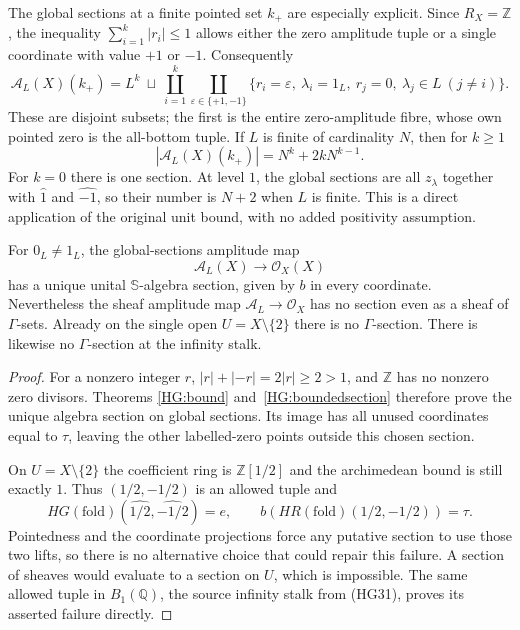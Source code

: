 The global sections at a finite pointed set $k_+$ are especially
explicit.  Since $R_X=\mathbb Z$, the inequality
$\sum_{i=1}^k|r_i|\le1$ allows either the zero amplitude
tuple or a single coordinate with value $+1$ or $-1$.
Consequently
\begin{equation}\tag{HG32}
 \mathcal A_L(X)(k_+)=
 L^k\ \sqcup\
 \coprod_{i=1}^k\coprod_{\varepsilon\in\{+1,-1\}}
       \bigl\{r_i=\varepsilon,\ \lambda_i=1_L,\
              r_j=0,\ \lambda_j\in L\ (j\ne i)\bigr\}.
\end{equation}
These are disjoint subsets; the first is the entire
zero-amplitude fibre, whose own pointed zero is the all-bottom
tuple.  If $L$ is finite of cardinality $N$, then for $k\ge1$
\begin{equation}\tag{HG33}
 |\mathcal A_L(X)(k_+)|=N^k+2kN^{k-1}.
\end{equation}
For $k=0$ there is one section.  At level $1$, the global
sections are all $z_\lambda$ together with $\widehat1$ and
$\widehat{-1}$, so their number is $N+2$ when $L$ is finite.
This is a direct application of the original unit bound, with
no added positivity assumption.

\begin{proposition}\label{HG:globalstalkdefect}
For $0_L\ne1_L$, the global-sections amplitude map
\begin{equation}\tag{HG36}
 \mathcal A_L(X)\longrightarrow\mathcal O_X(X)
\end{equation}
has a unique unital $\mathbb S$-algebra section, given by
$b$ in every coordinate.  Nevertheless the sheaf amplitude
map $\mathcal A_L\to\mathcal O_X$ has no section even as
a sheaf of $\Gamma$-sets.  Already on the single open
$U=X\setminus\{2\}$ there is no $\Gamma$-section.  There
is likewise no $\Gamma$-section at the infinity stalk.
\end{proposition}
\begin{proof}
For a nonzero integer $r$, $|r|+|-r|=2|r|\ge2>1$,
and $\mathbb Z$ has no nonzero zero divisors.  Theorems
\ref{HG:bound} and~\ref{HG:boundedsection} therefore prove
the unique algebra section on global sections.  Its image
has all unused coordinates equal to $\tau$, leaving the
other labelled-zero points outside this chosen section.

On $U=X\setminus\{2\}$ the coefficient ring is
$\mathbb Z[1/2]$ and the archimedean bound is still exactly
$1$.  Thus $(1/2,-1/2)$ is an allowed tuple and
\begin{equation}\tag{HG37}
 HG(\mathrm{fold})(\widehat{1/2},\widehat{-1/2})=e,
 \qquad b(HR(\mathrm{fold})(1/2,-1/2))=\tau.
\end{equation}
Pointedness and the coordinate projections force any
putative section to use those two lifts, so there is no
alternative choice that could repair this failure.  A
section of sheaves would evaluate to a section on $U$,
which is impossible.  The same allowed tuple in
$B_1(\mathbb Q)$, the source infinity stalk from (HG31),
proves its asserted failure directly.
\end{proof}

